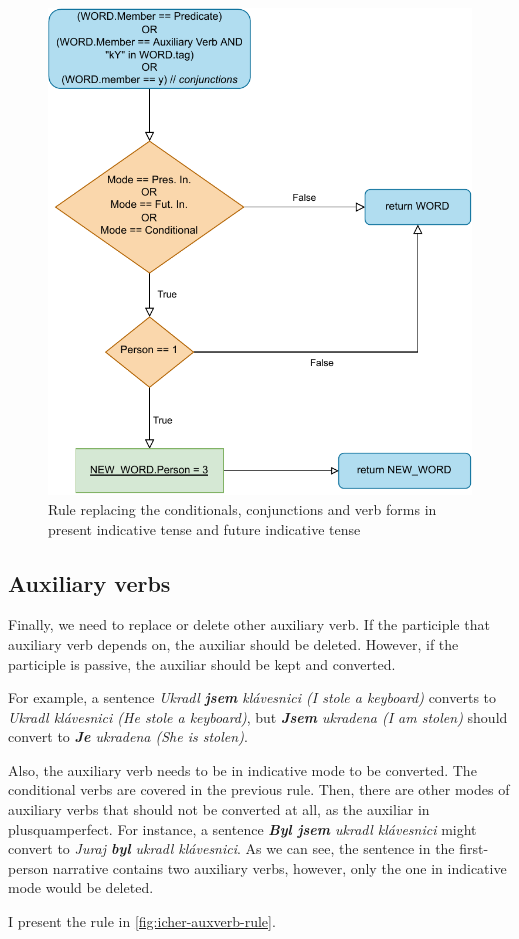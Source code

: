 \begin{figure}[ht!]
\includegraphics[width=\textwidth]{data/Icher-Predicate-Rule.pdf}
\caption{Rule replacing the conditionals, conjunctions and verb forms in present indicative tense and future indicative tense}
\label{fig:icher-predicate-rule}
\end{figure}

\subsection{Auxiliary verbs}

Finally, we need to replace or delete other auxiliary verb. If the participle that auxiliary verb depends on, the auxiliar should be deleted. However, if the participle is passive, the auxiliar should be kept and converted.

For example, a sentence \emph{Ukradl \textbf{jsem} klávesnici (I stole a keyboard)} converts to \emph{Ukradl klávesnici (He stole a keyboard)}, but \emph{\textbf{Jsem} ukradena (I am stolen)} should convert to \emph{\textbf{Je} ukradena (She is stolen)}.

Also, the auxiliary verb needs to be in indicative mode to be converted. The conditional verbs are covered in the previous rule. Then, there are other modes of auxiliary verbs that should not be converted at all, as the auxiliar in plusquamperfect. For instance, a sentence \emph{\textbf{Byl jsem} ukradl klávesnici} might convert to \emph{Juraj \textbf{byl} ukradl klávesnici}. As we can see, the sentence in the first-person narrative contains two auxiliary verbs, however, only the one in indicative mode would be deleted.

I present the rule in \ref{fig:icher-auxverb-rule}.


